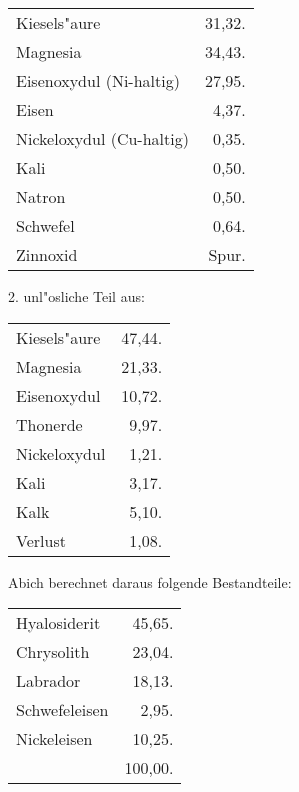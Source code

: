 \documentclass[a4paper, 11pt, oneside]{article}
\begin{document}
\begin{table}[H]
    \centering
    \begin{tabular}{l r}
    \hline
        Kiesels"aure & 31,32. \\
        Magnesia & 34,43. \\
        Eisenoxydul (Ni-haltig) & 27,95. \\
        Eisen & 4,37. \\
        Nickeloxydul (Cu-haltig) & 0,35. \\
        Kali & 0,50. \\
        Natron & 0,50. \\
        Schwefel & 0,64. \\
        Zinnoxid & Spur. \\
    \end{tabular}
\end{table}

\begin{center}
2. unl"osliche Teil aus:
\end{center}

\begin{table}[H]
    \centering
    \begin{tabular}{l r}
    \hline
        Kiesels"aure & 47,44. \\
        Magnesia & 21,33. \\
        Eisenoxydul & 10,72. \\
        Thonerde & 9,97. \\
        Nickeloxydul & 1,21. \\
        Kali & 3,17. \\
        Kalk & 5,10. \\
        Verlust & 1,08. \\
    \end{tabular}
\end{table}

\begin{center}
Abich berechnet daraus folgende Bestandteile:
\end{center}

\begin{table}[H]
    \centering
    \begin{tabular}{l r}
    \hline
        Hyalosiderit & 45,65. \\
        Chrysolith & 23,04. \\
        Labrador & 18,13. \\
        Schwefeleisen & 2,95. \\
        Nickeleisen & 10,25. \\
         & 100,00. \\
    \end{tabular}
\end{table}
\end{document}
